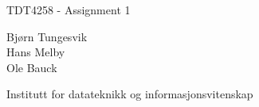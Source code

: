 \begin{titlepage}
    \begin{center}
      \large  
      
      \hfill
      
      \vfill
      
      \begingroup
      \LARGE TDT4258 - Assignment 1
      \bigskip
      \endgroup
      
      {\sc Bjørn Tungesvik}\\
      {\sc Hans Melby} \\
      {\sc Ole Bauck}\\
      
      \vspace{12cm}

      Institutt for datateknikk og informasjonsvitenskap 
       
    \end{center}  
\end{titlepage}

